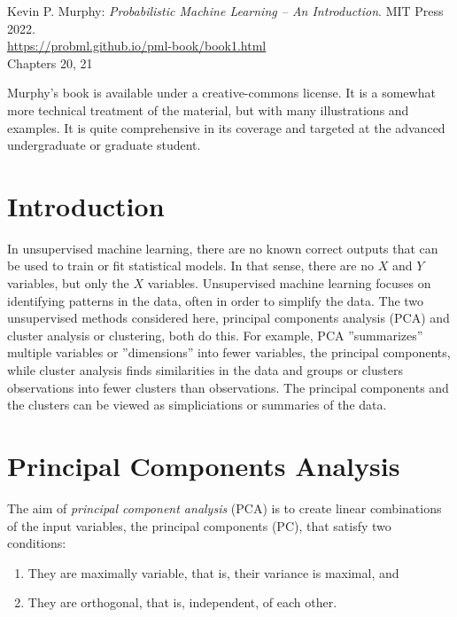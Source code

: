 \begin{tcolorbox}[colback=alert]
Kevin P. Murphy: \emph{Probabilistic Machine Learning -- An Introduction}. MIT Press 2022. \\
\vspace{1mm}
\url{https://probml.github.io/pml-book/book1.html} \\
\vspace{1mm}
Chapters 20, 21
\end{tcolorbox}

Murphy's book is available under a creative-commons license. It is a somewhat more technical treatment of the material, but with many illustrations and examples. It is quite comprehensive in its coverage and targeted at the advanced undergraduate or graduate student. 

\section{Introduction}

In unsupervised machine learning, there are no known correct outputs that can be used to train or fit statistical models. In that sense, there are no $X$ and $Y$ variables, but only the $X$ variables. Unsupervised machine learning focuses on identifying patterns in the data, often in order to simplify the data. The two unsupervised methods considered here, principal components analysis (PCA) and cluster analysis or clustering, both do this. For example, PCA ''summarizes'' multiple variables or ''dimensions'' into fewer variables, the principal components, while cluster analysis finds similarities in the data and groups or clusters observations into fewer clusters than observations. The principal components and the clusters can be viewed as simpliciations or summaries of the data. 

\section{Principal Components Analysis}

The aim of \emph{principal component analysis} (PCA) is to create linear combinations of the input variables, the principal components (PC), that satisfy two conditions:

\begin{enumerate}
\item They are maximally variable, that is, their variance is maximal, and
\item They are orthogonal, that is, independent, of each other.
\end{enumerate}

